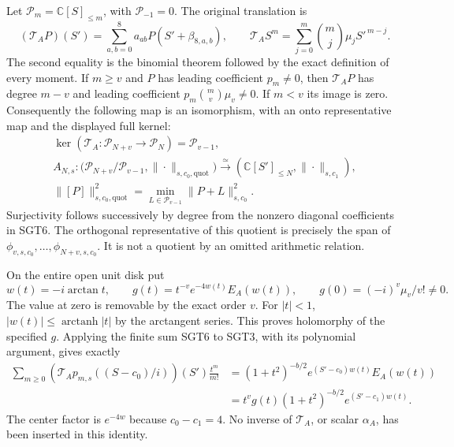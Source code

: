 \documentclass[11pt,a4paper]{article}
\begin{document}
Let $\mathcal P_m=\mathbb C[S]_{\le m}$, with
$\mathcal P_{-1}=0$. The original translation is
\[
 (\mathcal T_AP)(S')=\sum_{a,b=0}^8
                 a_{ab}P(S'+\beta_{8,a,b}),\qquad
 \mathcal T_AS^m=
       \sum_{j=0}^m\binom mj\mu_jS'^{\,m-j}.
 \tag{SGT6}
\]
The second equality is the binomial theorem followed by the exact
definition of every moment. If $m\ge v$ and $P$ has leading coefficient
$p_m\ne0$, then $\mathcal T_AP$ has degree $m-v$ and leading coefficient
$p_m\binom mv\mu_v\ne0$. If $m<v$ its image is zero.
Consequently the following map is an isomorphism, with an onto
representative map and the displayed full kernel:
\[
\begin{gathered}
 \ker(\mathcal T_A:\mathcal P_{N+v}\longrightarrow\mathcal P_N)
       =\mathcal P_{v-1},\\
 A_{N,s}:\bigl(\mathcal P_{N+v}/\mathcal P_{v-1},
                       \|\cdot\|_{s,c_0,\mathrm{quot}}\bigr)
       \xrightarrow{\ \simeq\ }
                (\mathbb C[S']_{\le N},\|\cdot\|_{s,c_1}),\\
 \|[P]\|_{s,c_0,\mathrm{quot}}^2
       =\min_{L\in\mathcal P_{v-1}}\|P+L\|_{s,c_0}^2 .
\end{gathered}\tag{SGT7}
\]
Surjectivity follows successively by degree from the nonzero diagonal
coefficients in SGT6. The orthogonal representative of this quotient
is precisely the span of $\phi_{v,s,c_0},\ldots,\phi_{N+v,s,c_0}$.
It is not a quotient by an omitted arithmetic relation.

On the entire open unit disk put
\[
 w(t)=-i\arctan t,\qquad
 g(t)=t^{-v}e^{-4w(t)}E_A(w(t)),\qquad
 g(0)=(-i)^v\mu_v/v!\ne0 .
 \tag{SGT8}
\]
The value at zero is removable by the exact order $v$.
For $|t|<1$, $|w(t)|\le\operatorname{arctanh}|t|$ by the
arctangent series. This proves holomorphy of the specified $g$.
Applying the finite sum SGT6 to SGT3, with its polynomial argument,
gives exactly
\[
\begin{split}
 \sum_{m\ge0}(\mathcal T_Ap_{m,s}((S-c_0)/i))(S')
                   \frac{t^m}{m!}
 &= (1+t^2)^{-b/2}e^{(S'-c_0)w(t)}E_A(w(t))\\
 &=t^vg(t)(1+t^2)^{-b/2}e^{(S'-c_1)w(t)} .
\end{split}\tag{SGT9}
\]
The center factor is $e^{-4w}$ because $c_0-c_1=4$.
No inverse of $\mathcal T_A$, or scalar $\alpha_A$, has been inserted
in this identity.
\end{document}
